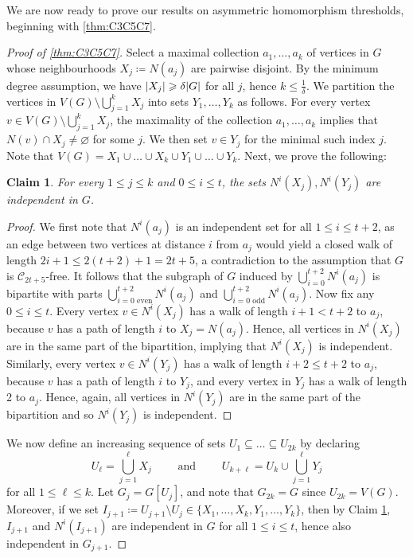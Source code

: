 \documentclass[reqno, english, 12pt]{amsart}
\theoremstyle{plain}
\newtheorem{claim}[theorem]{Claim}
\theoremstyle{remark}
\DeclarePairedDelimiter{\abs}{\lvert}{\rvert}
\renewcommand{\leq}{\leqslant}
\renewcommand{\geq}{\geqslant}
\newcommand\C{\mathscr{C}}
\begin{document}
We are now ready to prove our results on asymmetric homomorphism thresholds, beginning with \cref{thm:C3C5C7}.

\begin{proof}[Proof of \cref{thm:C3C5C7}]
    Select a maximal collection $a_1,\dots,a_k$ of vertices in $G$ whose neighbourhoods $X_j \coloneqq N(a_j)$ are pairwise disjoint. By the minimum degree assumption, we have $\abs{X_j}\geq \delta \abs G$ for all $j$, hence $k \leq {\frac 1 \delta}$. We partition the vertices in $V(G) \setminus \bigcup_{j=1}^k X_j$ into sets $Y_1,\dots,Y_k$ as follows. For every vertex $v \in V(G) \setminus \bigcup_{j=1}^k X_j$, the maximality of the collection $a_1,\dots,a_k$ implies that $N(v) \cap X_j \neq \varnothing$ for some $j$. We then set $v \in Y_j$ for the minimal such index $j$. Note that $V(G) = X_1 \cup \dots \cup X_k \cup Y_1 \cup \dots \cup Y_k$. Next, we prove the following:

    \begin{claim}\label{claim:independent layers}
        For every $1 \leq j \leq k$ and $0 \leq i \leq t$, the sets $N^i(X_j),N^i(Y_j)$ are independent in $G$.
    \end{claim}


    \begin{proof}
    We first note that $N^i(a_j)$ is an independent set for all $1 \leq i \leq t+2$, as an edge between two vertices at distance $i$ from $a_j$ would yield a closed walk of length $2i+1 \leq 2(t+2)+1=2t+5$, a contradiction to the assumption that $G$ is $\C_{2t+5}$-free. 
    It follows that the subgraph of $G$ induced by $\bigcup_{i=0}^{t+2}N^i(a_j)$ is bipartite
    with parts $\bigcup_{i = 0 \text{ even}}^{t+2}N^i(a_j)$ and
    $\bigcup_{i = 0 \text{ odd}}^{t+2}N^i(a_j)$. Now fix any $0 \leq i \leq t$. Every vertex $v \in N^i(X_j)$ has a walk of length $i+1 < t+2$ to $a_j$, because $v$ has a path of length $i$ to $X_j = N(a_j)$. Hence, all vertices in $N^i(X_j)$ are in the same part of the bipartition, implying that $N^i(X_j)$ is independent. Similarly, every vertex $v \in N^i(Y_j)$ has a walk of length $i+2 \leq t+2$ to $a_j$, because $v$ has a path of length $i$ to $Y_j$, and every vertex in $Y_j$ has a walk of length 2 to $a_j$. Hence, again, all vertices in $N^i(Y_j)$ are in the same part of the bipartition and so $N^i(Y_j)$ is independent.   
    \end{proof}



	We now define an increasing sequence of sets $U_1 \subseteq \dots \subseteq U_{2k}$ by declaring 
	\[
		U_\ell = \bigcup_{j=1}^\ell X_j \qquad \text{ and } \qquad U_{k+\ell} = U_k \cup \bigcup_{j=1}^\ell Y_j
	\]
	for all $1 \leq \ell \leq k$. Let $G_j = G[U_j]$, and note that $G_{2k}=G$ since $U_{2k} = V(G)$. Moreover, if we set $I_{j+1} \coloneqq U_{j+1} \setminus U_{j} \in \{X_1,\dots,X_k,Y_1,\dots,Y_k\}$, then by Claim \ref{claim:independent layers}, $I_{j+1}$ and $N^i(I_{j+1})$ are independent in $G$ for all $1 \leq i \leq t$, hence also independent in $G_{j+1}$.
    

\end{proof}
\end{document}
